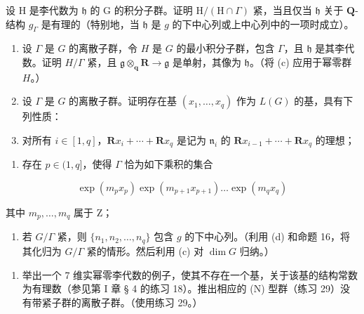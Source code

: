 设 H 是李代数为 \(\mathfrak{h}\) 的 G 的积分子群。证明 \(\mathrm{H} / (\mathrm{H} \cap \Gamma)\) 紧，当且仅当 \(\mathfrak{h}\) 关于 \(\mathbf{Q}\)-结构 \(g_{\Gamma}\) 是有理的（特别地，当 \(\mathfrak{h}\) 是 \(g\) 的下中心列或上中心列中的一项时成立）。

\begin{enumerate}
\def\labelenumi{(\alph{enumi})}
\setcounter{enumi}{3}
\item
  设 \(\Gamma\) 是 \(G\) 的离散子群，令 \(H\) 是 \(G\) 的最小积分子群，包含 \(\Gamma\)，且 \(\mathfrak{h}\) 是其李代数。证明 \(H / \Gamma\) 紧，且 \(\mathfrak{g} \otimes_{\mathbf{q}} \mathbf{R} \to \mathfrak{g}\) 是单射，其像为 \(\mathfrak{h}\)。（将 (c) 应用于幂零群 \(H\)。）
\item
  设 \(\Gamma\) 是 \(G\) 的离散子群。证明存在基 \((x_{1},\ldots ,x_{q})\) 作为 \(L(G)\) 的基，具有下列性质：
\item
  对所有 \(i \in [1, q]\)，\(\mathbf{R}x_i + \cdots + \mathbf{R}x_q\) 是记为 \(\mathfrak{n}_i\) 的 \(\mathbf{R}x_{i-1} + \cdots + \mathbf{R}x_q\) 的理想；
\end{enumerate}

\begin{enumerate}
\def\labelenumi{(\roman{enumi})}
\setcounter{enumi}{1}
\tightlist
\item
  存在 \(p \in (1, q]\)，使得 \(\Gamma\) 恰为如下乘积的集合
\end{enumerate}

\[
\exp (m _ {p} x _ {p}) \exp (m _ {p + 1} x _ {p + 1}) \dots \exp (m _ {q} x _ {q})
\]

其中 \(m_{p}, \ldots, m_{q}\) 属于 Z；

\begin{enumerate}
\def\labelenumi{(\roman{enumi})}
\setcounter{enumi}{2}
\tightlist
\item
  若 \(G / \Gamma\) 紧，则 \(\{n_1, n_2, \ldots, n_q\}\) 包含 \(g\) 的下中心列。（利用 (d) 和命题 16，将其化归为 \(G / \Gamma\) 紧的情形。然后利用 (c) 对 \(\dim G\) 归纳。）
\end{enumerate}

\begin{enumerate}
\def\labelenumi{(\arabic{enumi})}
\setcounter{enumi}{29}
\tightlist
\item
  举出一个 7 维实幂零李代数的例子，使其不存在一个基，关于该基的结构常数为有理数（参见第 I 章 § 4 的练习 18）。推出相应的 (N) 型群（练习 29）没有带紧子群的离散子群。（使用练习 29。）
\end{enumerate}

